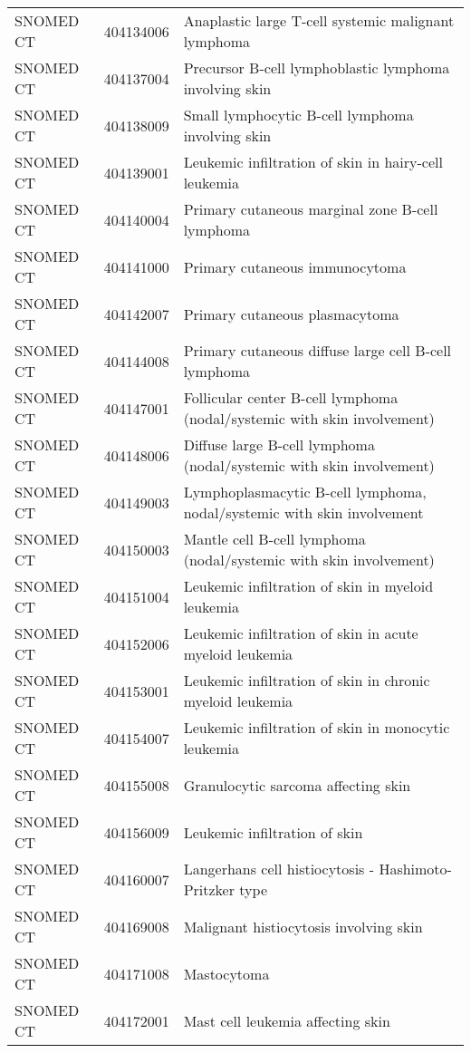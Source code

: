 \begin{table}[ht]
\begin{tabular}{lll}
  SNOMED CT & 404134006 & Anaplastic large T-cell systemic malignant lymphoma \\ 
  SNOMED CT & 404137004 & Precursor B-cell lymphoblastic lymphoma involving skin \\ 
  SNOMED CT & 404138009 & Small lymphocytic B-cell lymphoma involving skin \\ 
  SNOMED CT & 404139001 & Leukemic infiltration of skin in hairy-cell leukemia \\ 
  SNOMED CT & 404140004 & Primary cutaneous marginal zone B-cell lymphoma \\ 
  SNOMED CT & 404141000 & Primary cutaneous immunocytoma \\ 
  SNOMED CT & 404142007 & Primary cutaneous plasmacytoma \\ 
  SNOMED CT & 404144008 & Primary cutaneous diffuse large cell B-cell lymphoma \\ 
  SNOMED CT & 404147001 & Follicular center B-cell lymphoma (nodal/systemic with skin involvement) \\ 
  SNOMED CT & 404148006 & Diffuse large B-cell lymphoma (nodal/systemic with skin involvement) \\ 
  SNOMED CT & 404149003 & Lymphoplasmacytic B-cell lymphoma, nodal/systemic with skin involvement \\ 
  SNOMED CT & 404150003 & Mantle cell B-cell lymphoma (nodal/systemic with skin involvement) \\ 
  SNOMED CT & 404151004 & Leukemic infiltration of skin in myeloid leukemia \\ 
  SNOMED CT & 404152006 & Leukemic infiltration of skin in acute myeloid leukemia \\ 
  SNOMED CT & 404153001 & Leukemic infiltration of skin in chronic myeloid leukemia \\ 
  SNOMED CT & 404154007 & Leukemic infiltration of skin in monocytic leukemia \\ 
  SNOMED CT & 404155008 & Granulocytic sarcoma affecting skin \\ 
  SNOMED CT & 404156009 & Leukemic infiltration of skin \\ 
  SNOMED CT & 404160007 & Langerhans cell histiocytosis - Hashimoto-Pritzker type \\ 
  SNOMED CT & 404169008 & Malignant histiocytosis involving skin \\ 
  SNOMED CT & 404171008 & Mastocytoma \\ 
  SNOMED CT & 404172001 & Mast cell leukemia affecting skin \\ 

\end{tabular}
\end{table}
